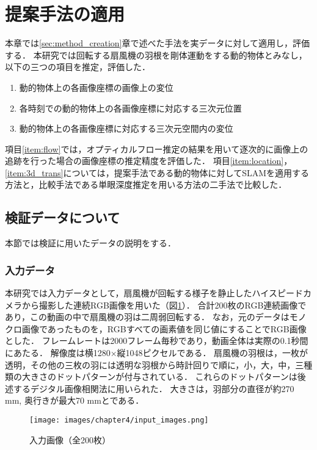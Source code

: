 \section{提案手法の適用}\label{sec:method_appliance}
本章では\ref{sec:method_creation}章で述べた手法を実データに対して適用し，評価する．
本研究では回転する扇風機の羽根を剛体運動をする動的物体とみなし，以下の三つの項目を推定，評価した．
\begin{enumerate}
	\item 動的物体上の各画像座標の画像上の変位\label{item:flow}
	\item 各時刻での動的物体上の各画像座標に対応する三次元位置\label{item:location}
	\item 動的物体上の各画像座標に対応する三次元空間内の変位\label{item:3d_trans}
\end{enumerate}
項目\ref{item:flow}では，オプティカルフロー推定の結果を用いて逐次的に画像上の追跡を行った場合の画像座標の推定精度を評価した．
項目\ref{item:location}，\ref{item:3d_trans}については，提案手法である動的物体に対してSLAMを適用する方法と，比較手法である単眼深度推定を用いる方法の二手法で比較した．

\subsection{検証データについて}\label{subsec:data}
本節では検証に用いたデータの説明をする．

\subsubsection{入力データ}\label{subsubsec:input_data}
本研究では入力データとして，扇風機が回転する様子を静止したハイスピードカメラから撮影した連続RGB画像を用いた（図\ref{fig:input_data}）．
合計200枚のRGB連続画像であり，この動画の中で扇風機の羽は二周弱回転する．
なお，元のデータはモノクロ画像であったものを，RGBすべての画素値を同じ値にすることでRGB画像とした．
フレームレートは2000フレーム毎秒であり，動画全体は実際の0.1秒間にあたる．
解像度は横1280×縦1048ピクセルである．
扇風機の羽根は，一枚が透明，その他の三枚の羽には透明な羽根から時計回りで順に，小，大，中，三種類の大きさのドットパターンが付与されている．
これらのドットパターンは後述するデジタル画像相関法に用いられた．
大きさは，羽部分の直径が約270 mm, 奥行きが最大70 mmとである．

\begin{figure}[h]
	\centering
	\texttt{[image: images/chapter4/input\_images.png]}
	\caption[入力画像]{入力画像（全200枚）}
	\label{fig:input_data}
\end{figure}

